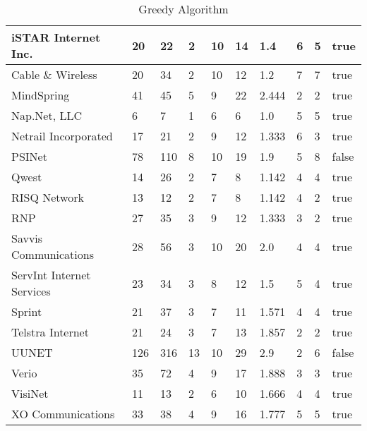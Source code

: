\documentclass [12pt]{article}
\begin{document}
\begin{table}[H]
\begin{tabular}{ | l | l | l | l | l | l | l | l | l | l | }
      iSTAR Internet Inc. & 20 & 22 & 2 & 10 & 14 & 1.4 & 6 & 5 & true\\ \hline
      Cable \& Wireless & 20 & 34 & 2 & 10 & 12 & 1.2 & 7 & 7 & true\\ \hline
      MindSpring & 41 & 45 & 5 & 9 & 22 & 2.444 & 2 & 2 & true\\ \hline
      Nap.Net, LLC & 6 & 7 & 1 & 6 & 6 & 1.0 & 5 & 5 & true\\ \hline
      Netrail Incorporated & 17 & 21 & 2 & 9 & 12 & 1.333 & 6 & 3 & true\\ \hline
      PSINet & 78 & 110 & 8 & 10 & 19 & 1.9 & 5 & 8 & false\\ \hline
      Qwest & 14 & 26 & 2 & 7 & 8 & 1.142 & 4 & 4 & true\\ \hline
      RISQ Network & 13 & 12 & 2 & 7 & 8 & 1.142 & 4 & 2 & true\\ \hline
      RNP & 27 & 35 & 3 & 9 & 12 & 1.333 & 3 & 2 & true\\ \hline
      Savvis Communications & 28 & 56 & 3 & 10 & 20 & 2.0 & 4 & 4 & true\\ \hline
      ServInt Internet Services & 23 & 34 & 3 & 8 & 12 & 1.5 & 5 & 4 & true\\ \hline
      Sprint & 21 & 37 & 3 & 7 & 11 & 1.571 & 4 & 4 & true\\ \hline
      Telstra Internet & 21 & 24 & 3 & 7 & 13 & 1.857 & 2 & 2 & true\\ \hline
      UUNET & 126 & 316 & 13 & 10 & 29 & 2.9 & 2 & 6 & false\\ \hline
      Verio & 35 & 72 & 4 & 9 & 17 & 1.888 & 3 & 3 & true\\ \hline
      VisiNet & 11 & 13 & 2 & 6 & 10 & 1.666 & 4 & 4 & true\\ \hline
      XO Communications & 33 & 38 & 4 & 9 & 16 & 1.777 & 5 & 5 & true\\ \hline
    \end{tabular}
    \caption{Greedy Algorithm}
    \label{table:greedyloc}
  \end{table}
\end{document}
